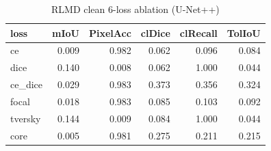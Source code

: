 \begin{table}
\caption{RLMD clean 6-loss ablation (U-Net++)}
\begin{tabular}{lrrrrr}
\toprule
loss & mIoU & PixelAcc & clDice & clRecall & TolIoU \\
\midrule
ce & 0.009 & 0.982 & 0.062 & 0.096 & 0.084 \\
dice & 0.140 & 0.008 & 0.062 & 1.000 & 0.044 \\
ce_dice & 0.029 & 0.983 & 0.373 & 0.356 & 0.324 \\
focal & 0.018 & 0.983 & 0.085 & 0.103 & 0.092 \\
tversky & 0.144 & 0.009 & 0.084 & 1.000 & 0.044 \\
core & 0.005 & 0.981 & 0.275 & 0.211 & 0.215 \\
\bottomrule
\end{tabular}
\end{table}
